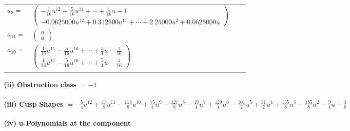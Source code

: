 \documentclass[1p]{elsarticle_modified}
\theoremstyle{definition}
\begin{document}
\begin{tabular}{m{7pt} m{180pt} m{7pt} m{180pt} }
\flushright $a_{8}=$&$\begin{pmatrix}-\frac{1}{16} u^{12}+\frac{5}{16} u^{11}+\cdots+\frac{1}{16} u-1\\-0.0625000 u^{12}+0.312500 u^{11}+\cdots-2.25000 u^{2}+0.0625000 u\end{pmatrix}$ \\
\flushright $a_{11}=$&$\begin{pmatrix}u\\u\end{pmatrix}$ \\
\flushright $a_{10}=$&$\begin{pmatrix}\frac{1}{16} u^{11}-\frac{5}{16} u^{10}+\cdots+\frac{5}{4} u-\frac{1}{16}\\\frac{1}{16} u^{11}-\frac{5}{16} u^{10}+\cdots+\frac{5}{4} u-\frac{1}{16}\end{pmatrix}$\\&\end{tabular}
\flushleft \textbf{(ii) Obstruction class $= -1$}\\~\\
\flushleft \textbf{(iii) Cusp Shapes $= -\frac{5}{4} u^{12}+\frac{47}{8} u^{11}-\frac{113}{8} u^{10}+\frac{75}{4} u^9-\frac{127}{8} u^8-\frac{19}{4} u^7+\frac{129}{4} u^6-\frac{101}{2} u^5+\frac{31}{2} u^4+\frac{135}{8} u^3-\frac{385}{8} u^2-\frac{9}{4} u-\frac{3}{8}$}\\~\\
\newpage\renewcommand{\arraystretch}{1}
\flushleft \textbf{(iv) u-Polynomials at the component}\newline \\
\end{document}
